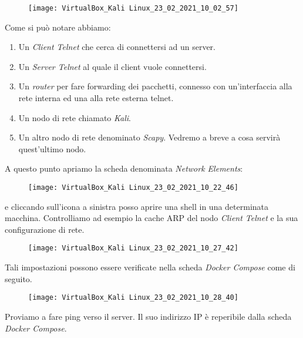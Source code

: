 \documentclass[14pt]{extreport}
\begin{document}
\begin{figure}[H]
\centering
\texttt{[image: VirtualBox\_Kali Linux\_23\_02\_2021\_10\_02\_57]}
\end{figure}

Come si può notare abbiamo:

\begin{enumerate}
    \item Un \textit{Client Telnet} che cerca di connettersi ad un server.
    \item Un \textit{Server Telnet} al quale il client vuole connettersi.
    \item Un \textit{router} per fare forwarding dei pacchetti, connesso con un'interfaccia alla rete interna ed una alla rete esterna telnet.
    \item Un nodo di rete  chiamato \textit{Kali}.
    \item Un altro nodo di rete denominato \textit{Scapy}. Vedremo a breve a cosa servirà quest'ultimo nodo.
\end{enumerate}

A questo punto apriamo la scheda denominata \textit{Network Elements}:

\begin{figure}[H]
\centering
\texttt{[image: VirtualBox\_Kali Linux\_23\_02\_2021\_10\_22\_46]}
\end{figure}







e cliccando sull'icona a sinistra posso aprire una shell in una determinata macchina.
Controlliamo ad esempio la cache ARP del nodo \textit{Client Telnet} e la sua configurazione di rete.

\begin{figure}[H]
\centering
\texttt{[image: VirtualBox\_Kali Linux\_23\_02\_2021\_10\_27\_42]}
\end{figure}


Tali impostazioni possono essere verificate nella scheda \textit{Docker Compose} come di seguito.

\begin{figure}[H]
\centering
\texttt{[image: VirtualBox\_Kali Linux\_23\_02\_2021\_10\_28\_40]}
\end{figure}


Proviamo a fare ping verso il server. Il suo indirizzo IP è reperibile dalla scheda \textit{Docker Compose}.
\end{document}
